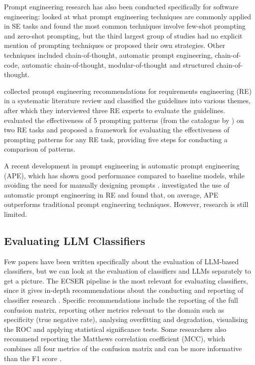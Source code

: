 \documentclass[a4paper]{article}
\begin{document}
Prompt engineering research has also been conducted specifically for software engineering: \textcite{hou2024} looked at what prompt engineering techniques are commonly applied in SE tasks and found the most common techniques involve few-shot prompting and zero-shot prompting, but the third largest group of studies had no explicit mention of prompting techniques or proposed their own strategies. Other techniques included chain-of-thought, automatic prompt engineering, chain-of-code, automatic chain-of-thought, modular-of-thought and structured chain-of-thought.

\textcite{arvidsson2023} collected prompt engineering recommendations for requirements engineering (RE) in a systematic literature review and classified the guidelines into various themes, after which they interviewed three RE experts to evaluate the guidelines. \textcite{ronanki2023} evaluated the effectiveness of 5 prompting patterns (from the catalogue by \textcite{white2023}) on two RE tasks and proposed a framework for evaluating the effectiveness of prompting patterns for any RE task, providing five steps for conducting a comparison of patterns.

A recent development in prompt engineering is automatic prompt engineering (APE), which has shown good performance compared to baseline models, while avoiding the need for manually designing prompts \cite{zhou2023ape,ye2024ape}. \textcite{zadenoori2025} investigated the use of automatic prompt engineering in RE and found that, on average, APE outperforms traditional prompt engineering techniques. However, research is still limited.

\subsection{Evaluating LLM Classifiers} \label{Evaluation of LLM Classifiers}
Few papers have been written specifically about the evaluation of LLM-based classifiers, but we can look at the evaluation of classifiers and LLMs separately to get a picture. The ECSER pipeline is the most relevant for evaluating classifiers, since it gives in-depth recommendations about the conducting and reporting of classifier research \cite{Dellanna2022}. Specific recommendations include the reporting of the full confusion matrix, reporting other metrics relevant to the domain such as specificity (true negative rate), analysing overfitting and degradation, visualising the ROC and applying statistical significance tests. Some researchers also recommend reporting the Matthews correlation coefficient (MCC), which combines all four metrics of the confusion matrix and can be more informative than the F1 score \cite{Chicco2020,Foody2023,Yao2020}. 
\end{document}
